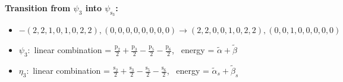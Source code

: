 \documentclass[12pt,a4paper]{article}
\begin{document}
        \noindent\textbf{Transition from $\psi_{3}$ into $\psi_{\text{s}_{3}}$:}
        \begin{itemize}
            \item $- (2, 2, 1, 0, 1, 0, 2, 2), (0, 0, 0, 0, 0, 0, 0, 0) \rightarrow (2, 2, 0, 0, 1, 0, 2, 2), (0, 0, 1, 0, 0, 0, 0, 0)$
        
            \item $\psi_{3}:$ linear combination = $\frac{\text{p}_{2}}{2} + \frac{\text{p}_{3}}{2} - \frac{\text{p}_{5}}{2} - \frac{\text{p}_{6}}{2}$, \
            energy = $\tilde{\alpha} + \tilde{\beta}$
            
            \item $\eta_{3}:$ linear combination = $\frac{\text{s}_{2}}{2} + \frac{\text{s}_{3}}{2} - \frac{\text{s}_{5}}{2} - \frac{\text{s}_{6}}{2}$, \
            energy = $\tilde{\alpha}_{s} + \tilde{\beta}_{s}$
            

\end{itemize}
\end{document}

